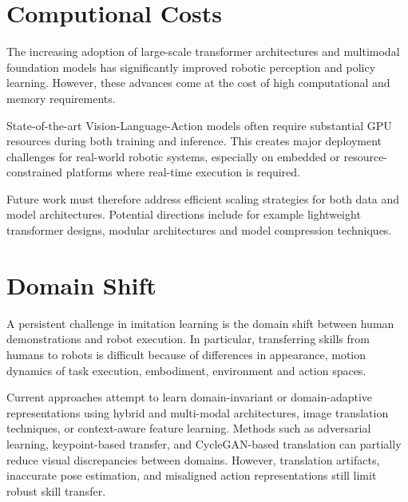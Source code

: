 



\section{Computional Costs}
The increasing adoption of large-scale transformer architectures and multimodal foundation models has significantly improved robotic perception and policy learning. However, these advances come at the cost of high computational and memory requirements.

State-of-the-art Vision-Language-Action models often require substantial GPU resources during both training and inference. This creates major deployment challenges for real-world robotic systems, especially on embedded or resource-constrained platforms where real-time execution is required.

Future work must therefore address efficient scaling strategies for both data and model architectures. Potential directions include for example lightweight transformer designs, modular architectures and model compression techniques.


\section{Domain Shift}
A persistent challenge in imitation learning is the domain shift between
human demonstrations and robot execution. In particular, transferring skills from humans to robots is difficult because of differences in appearance, motion dynamics of task execution, embodiment, environment and action spaces. 

Current approaches attempt to learn domain-invariant or domain-adaptive representations using hybrid and multi-modal architectures, image translation techniques, or context-aware feature learning. Methods such as adversarial learning, keypoint-based transfer, and CycleGAN-based translation can partially reduce visual discrepancies between domains. However, translation artifacts, inaccurate pose estimation, and misaligned action representations still limit robust skill transfer.

